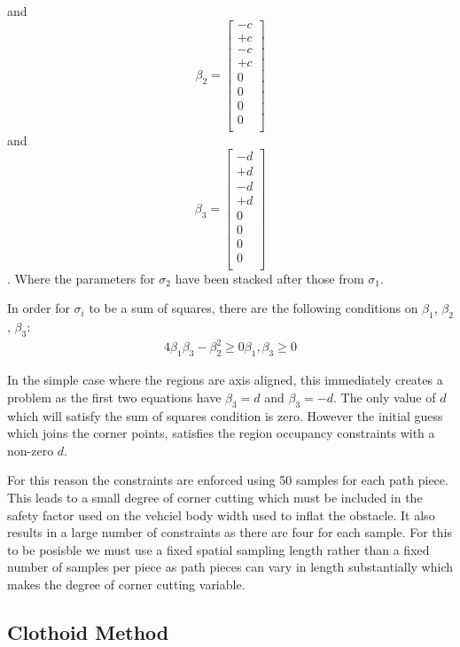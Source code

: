 and
\begin{equation}
\beta_2 = \left[\begin{array}{c}
-c \\
+c  \\
-c \\
+c \\
0\\
0 \\
0 \\
0 \\
\end{array}\right]
\end{equation}
and
\begin{equation}
\beta_3 = \left[\begin{array}{c}
-d \\
+d  \\
-d \\
+d \\
0\\
0 \\
0 \\
0 \\
\end{array}\right]
\end{equation}
. Where the parameters for $\sigma_2$ have been stacked after those from $\sigma_1$. 

In order for $\sigma_i$ to be a sum of squares, there are the following conditions on $\beta_1$, $\beta_2$, $\beta_3$:
\begin{equation}
\begin{array}{c}
4\beta_1\beta_3 - \beta_2^2 \geq 0
\beta_1, \beta_3 \geq 0
\end{array}
\end{equation}

 In the simple case where the regions are axis aligned, this immediately creates a problem as the first two equations have $\beta_3 = d$ and $\beta_3 = -d$. The only value of $d$ which will satisfy the sum of squares condition is zero. However the initial guess which joins the corner points, satisfies the region occupancy constraints with a non-zero $d$. 
 
 For this reason the constraints are enforced using 50 samples for each path piece. This leads to a small degree of corner cutting which must be included in the safety factor used on the vehciel body width used to inflat the obstacle. It also results in a large number of constraints as there are four for each sample. For this to be posisble we must use a fixed spatial sampling length rather than a fixed number of samples per piece as path pieces can vary in length substantially which makes the degree of corner cutting variable.
 



\subsection{Clothoid Method}
